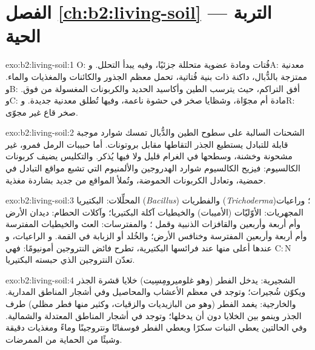 \section*{الفصل \ref{ch:b2:living-soil} --- التربة الحية}

\begin{solution}{exo:b2:living-soil:1}
O: فُتات ومادة عضوية متحللة جزئيًا، وفيه يبدأ
التحلل. وA:  معدنية ممتزجة بالدُّبال، داكنة ذات بنية فُتاتية،
تحمل معظم الجذور والكائنات والمغذيات والماء. وB: أفق
التراكم، حيث يترسب الطين وأكاسيد الحديد والكربونات المغسولة
من فوق. وC: مادة أم مجوّاة، وشظايا صخر
في حشوة ناعمة، وفيها تُطلق  معدنية جديدة. وR:
صخر قاع غير مجوّى.
\end{solution}

\begin{solution}{exo:b2:living-soil:2}
الشحنات السالبة على سطوح الطين والدُّبال تمسك شوارد موجبة
قابلة للتبادل يستطيع الجذر التقاطها مقابل بروتونات. أما حبيبات الرمل
فمرو، غير مشحونة وخشنة، وسطحها في الغرام قليل
ولا  فيها يُذكر. والتكليس يضيف كربونات الكالسيوم:
فيزيح الكالسيوم شوارد الهدروجين والألمنيوم التي تشبع
مواقع التبادل في  حمضية، وتعادل الكربونات
الحموضة، وتُملأ المواقع من جديد بشاردة مغذية.
\end{solution}

\begin{solution}{exo:b2:living-soil:3}
المحلِّلات: البكتيريا (\emph{Bacillus}) والفطريات
(\emph{Trichoderma})؛ وراعيات المجهريات: الأوّليّات (الأميبات)
والخيطيات آكلة البكتيريا؛ وآكلات الحطام: ديدان الأرض وأم أربعة وأربعين
والقافزات الذنبية وقمل ؛ والمفترسات: العث والخيطيات المفترسة
وأم أربعة وأربعين المفترسة وخنافس الأرض؛ والخُلد أو الزبابة في القمة. و
الراعيات، و$\mathrm{C:N}$ عندها أعلى منها عند فرائسها البكتيرية،
تطرح فائض النتروجين أمونيومًا: فهي تعدّن
النتروجين الذي حبسته البكتيريا.
\end{solution}

\begin{solution}{exo:b2:living-soil:4}
الشجيرية: يدخل الفطر (وهو غلوميرومِسِيت) خلايا قشرة
الجذر ويكوّن شُجيرات؛ وتوجد في معظم الأعشاب والمحاصيل وفي
أشجار المناطق المدارية. والخارجية: يغمد الفطر (وهو من البازيديات
والزقيات، وكثير منها فطر مظلي) طرف الجذر
وينمو بين الخلايا دون أن يدخلها؛ وتوجد في أشجار المناطق المعتدلة
والشمالية. وفي الحالتين يعطي النبات سكرًا ويعطي الفطر
فوسفاتًا ونتروجينًا وماءً ومغذيات دقيقة وشيئًا من
الحماية من الممرضات.
\end{solution}

